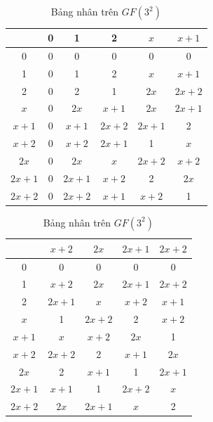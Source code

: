 \begin{table}[htb]
    \centering
    \begin{subtable}[h]{\textwidth}
        \centering
        \begin{tabular}{|c|c|c|c|c|c|}
            \hline
            & 0 & 1 & 2 & $x$ & $x+1$ \\
            \hline
            0 & 0 & 0 & 0 & 0 & 0 \\
            \hline
            1 & 0 & 1 & 2 & $x$ & $x+1$ \\
            \hline
            2 & 0 & 2 & 1 & $2x$ & $2x+2$\\
            \hline
            $x$ & 0 & $2x$ & $x+1$ & $2x$ & $2x+1$ \\
            \hline
            $x+1$ & 0 & $x+1$ & $2x+2$ & $2x+1$ & 2\\
            \hline
            $x+2$ & 0 & $x+2$ & $2x+1$ & 1 & $x$ \\
            \hline
            $2x$ & 0 & $2x$ & $x$ & $2x+2$ & $x+2$ \\
            \hline
            $2x+1$ & 0 & $2x+1$ & $x+2$ & 2 & $2x$ \\
            \hline
            $2x+2$ & 0 & $2x+2$ & $x+1$ & $x+2$ & 1 \\
            \hline
        \end{tabular}
        \caption{Nửa đầu bảng nhân}
    \end{subtable}
    
    \begin{subtable}[h]{\textwidth}
        \centering
        \begin{tabular}{|c|c|c|c|c|}
            \hline
            & $x+2$ & $2x$ & $2x+1$ & $2x+2$ \\
            \hline
            0 & 0 & 0 & 0 & 0 \\
            \hline
            1 & $x+2$ & $2x$ & $2x+1$ & $2x+2$ \\
            \hline
            2 & $2x+1$ & $x$ & $x+2$ & $x+1$ \\
            \hline
            $x$ & 1 & $2x+2$ & 2 & $x+2$ \\
            \hline
            $x+1$ & $x$ & $x+2$ & $2x$ & 1 \\
            \hline
            $x+2$ & $2x+2$ & 2 & $x+1$ & $2x$ \\
            \hline
            $2x$ & 2 & $x+1$ & 1 & $2x+1$ \\
            \hline
            $2x+1$ & $x+1$ & 1 & $2x+2$ & $x$ \\
            \hline
            $2x+2$ & $2x$ & $2x+1$ & $x$ & 2 \\
            \hline
        \end{tabular}
        \caption{Nửa sau bảng nhân}
    \end{subtable}
    \caption{Bảng nhân trên $GF(3^2)$}
    \label{gf_mult_3}
\end{table}

